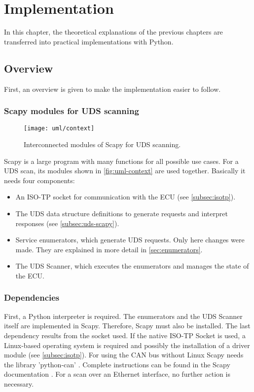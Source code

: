 \chapter{Implementation}

In this chapter, the theoretical explanations of the previous chapters are transferred into practical implementations with Python.

\section{Overview}

First, an overview is given to make the implementation easier to follow.

\subsection{Scapy modules for UDS scanning}

\begin{figure}[htb]
    \centering
    \texttt{[image: uml/context]}
    \caption{Interconnected modules of Scapy for UDS scanning.}
    \label{fig:uml-context}
\end{figure}

Scapy is a large program with many functions for all possible use cases. For a UDS scan, its modules shown in \autoref{fig:uml-context} are used together. Basically it needs four components:

\begin{itemize}
    \item An ISO-TP socket for communication with the ECU (see \autoref{subsec:isotp}).
    \item The UDS data structure definitions to generate requests and interpret responses (see \autoref{subsec:uds-scapy}).
    \item Service enumerators, which generate UDS requests. Only here changes were made. They are explained in more detail in \autoref{sec:enumerators}.
    \item The UDS Scanner, which executes the enumerators and manages the state of the ECU.
\end{itemize}

\subsection{Dependencies}

First, a Python interpreter is required.
The enumerators and the UDS Scanner itself are implemented in Scapy. Therefore, Scapy must also be installed. The last dependency results from the socket used. If the native ISO-TP Socket is used, a Linux-based operating system is required and possibly the installation of a driver module (see \autoref{subsec:isotp}). For using the CAN bus without Linux Scapy needs the library 'python-can' \cite{python-can}. Complete instructions can be found in the Scapy documentation \cite{scapy-automotive-doc}. For a scan over an Ethernet interface, no further action is necessary.

